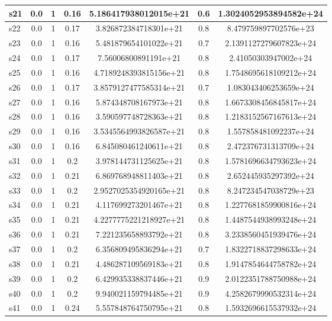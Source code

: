 \documentclass{article}
\begin{document}
\begin{tabular}{|l|c|c|c|c|c|c|}
\hline
s21 &0.0 & 1 & 0.16 & 5.186417938012015e+21 & 0.6 & 1.3024052953894582e+24\\
\hline
s22 &0.0 & 1 & 0.17 & 3.826872384718301e+21 & 0.8 & 8.479759897702576e+23\\
\hline
s23 &0.0 & 1 & 0.16 & 5.481879654101022e+21 & 0.7 & 2.1391127279607823e+24\\
\hline
s24 &0.0 & 1 & 0.17 & 7.56006800891191e+21 & 0.8 & 2.41050303947002e+24\\
\hline
s25 &0.0 & 1 & 0.16 & 4.7189248393815156e+21 & 0.8 & 1.7548695618109212e+24\\
\hline
s26 &0.0 & 1 & 0.17 & 3.8579127477585314e+21 & 0.7 & 1.083043406253659e+24\\
\hline
s27 &0.0 & 1 & 0.16 & 5.874348708167973e+21 & 0.8 & 1.6673308456845817e+24\\
\hline
s28 &0.0 & 1 & 0.16 & 3.590597748728363e+21 & 0.8 & 1.2183152567167613e+24\\
\hline
s29 &0.0 & 1 & 0.16 & 3.5345564993826587e+21 & 0.8 & 1.557858481092237e+24\\
\hline
s30 &0.0 & 1 & 0.16 & 6.845080461240611e+21 & 0.8 & 2.472376731313709e+24\\
\hline
s31 &0.0 & 1 & 0.2 & 3.978144731125625e+21 & 0.8 & 1.5781696634793623e+24\\
\hline
s32 &0.0 & 1 & 0.21 & 6.869768948811403e+21 & 0.8 & 2.652445935297392e+24\\
\hline
s33 &0.0 & 1 & 0.2 & 2.9527025354920165e+21 & 0.8 & 8.247234547038729e+23\\
\hline
s34 &0.0 & 1 & 0.21 & 4.117699273201467e+21 & 0.8 & 1.2277681859900816e+24\\
\hline
s35 &0.0 & 1 & 0.21 & 4.2277775221218927e+21 & 0.8 & 1.4487544938993248e+24\\
\hline
s36 &0.0 & 1 & 0.21 & 7.221235658893792e+21 & 0.8 & 3.2338560451939476e+24\\
\hline
s37 &0.0 & 1 & 0.2 & 6.356809495836294e+21 & 0.7 & 1.8322718837298633e+24\\
\hline
s38 &0.0 & 1 & 0.21 & 4.486287109569183e+21 & 0.8 & 1.9147854644758782e+24\\
\hline
s39 &0.0 & 1 & 0.2 & 6.429935338837446e+21 & 0.9 & 2.0122351788750988e+24\\
\hline
s40 &0.0 & 1 & 0.2 & 9.940021159794485e+21 & 0.9 & 4.2582679990532314e+24\\
\hline
s41 &0.0 & 1 & 0.24 & 5.557848764750795e+21 & 0.8 & 1.5932696615537932e+24\\
\hline

\end{tabular}
\end{document}
